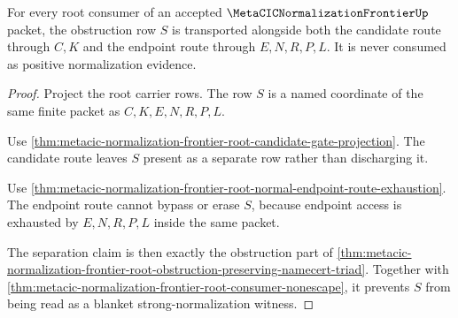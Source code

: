 \begin{theorem}
\label{thm:metacic-normalization-frontier-root-obstruction-route-separation}
For every root consumer of an accepted $\MetaCICNormalizationFrontierUp$ packet, the obstruction row $S$ is transported alongside both the candidate route through $C,K$ and the endpoint route through $E,N,R,P,L$. It is never consumed as positive normalization evidence.
\end{theorem}
\begin{proof}
Project the root carrier rows. The row $S$ is a named coordinate of the same finite packet as $C,K,E,N,R,P,L$.

Use \autoref{thm:metacic-normalization-frontier-root-candidate-gate-projection}. The candidate route leaves $S$ present as a separate row rather than discharging it.

Use \autoref{thm:metacic-normalization-frontier-root-normal-endpoint-route-exhaustion}. The endpoint route cannot bypass or erase $S$, because endpoint access is exhausted by $E,N,R,P,L$ inside the same packet.

The separation claim is then exactly the obstruction part of \autoref{thm:metacic-normalization-frontier-root-obstruction-preserving-namecert-triad}. Together with \autoref{thm:metacic-normalization-frontier-root-consumer-nonescape}, it prevents $S$ from being read as a blanket strong-normalization witness.
\end{proof}

